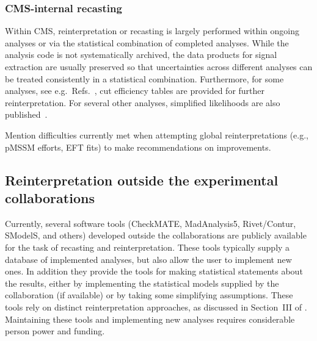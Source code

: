 \documentclass[11pt]{article}
\begin{document}


\subsubsection{CMS-internal recasting}

Within CMS, reinterpretation or recasting is largely performed within ongoing analyses or via the statistical combination of completed analyses. While the analysis code is not systematically archived, the data products for signal extraction are usually preserved so that uncertainties across different analyses can be treated consistently in a statistical combination. Furthermore, for some analyses, see e.g.\ Refs.~\cite{CMS:2017may,CMS:2018tuo}, cut efficiency tables are provided for further reinterpretation. For several other analyses, simplified likelihoods are also published~\cite{CMS:2017nxf,CMS:2017zts,CMS:2018ffd,CMS:2018eqb}.

Mention difficulties currently met when attempting global reinterpretations (e.g., pMSSM efforts, EFT fits) to make recommendations on improvements.


\subsection{Reinterpretation outside the experimental collaborations}




Currently, several software tools (CheckMATE, MadAnalysis5, Rivet/Contur, SModelS, and others) developed outside the collaborations are publicly available for the task of recasting and reinterpretation. These tools typically supply a database of implemented analyses, but also allow the user to implement new ones.
In addition they provide the tools for making statistical statements about the results, either by implementing the statistical models supplied by the collaboration (if available) or by taking some simplifying assumptions.
These tools rely on distinct reinterpretation approaches, as discussed in Section~III of \cite{LHCReinterpretationForum:2020xtr}.
Maintaining these tools and implementing new analyses requires considerable person power and funding.
\end{document}

